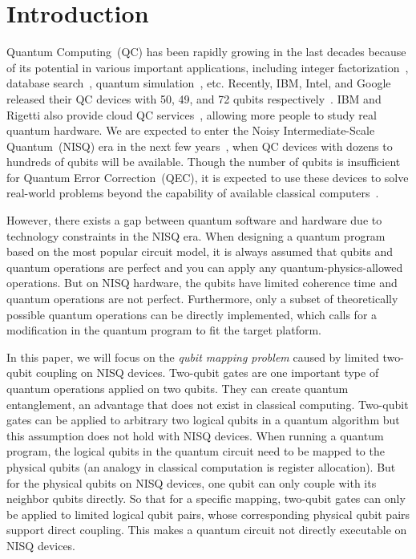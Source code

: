 \documentclass[journal,10pt,twocolumn]{IEEEtran}
\begin{document}
\section{Introduction}
Quantum Computing~(QC) has been rapidly growing in the last decades because of its %
potential in various important applications, including integer factorization~\cite{shor1999polynomial}, database search~\cite{grover1996fast}, quantum simulation~\cite{peruzzo2014variational}, etc. 
Recently, IBM, Intel, and Google released their QC devices with 50, 49, and 72 qubits respectively~\cite{IBM50Q, Intel49Q, Google72Q}. 
IBM and Rigetti also provide cloud QC services~\cite{IBMdevice,RigettiQPU}, allowing more people to study real quantum hardware. 
We are expected to enter the Noisy Intermediate-Scale Quantum~(NISQ) era in the next few years~\cite{preskill2018quantum}, when QC devices with dozens to hundreds of qubits will be available. %
Though the number of qubits is insufficient for Quantum Error Correction~(QEC), it is expected to use these devices to solve real-world problems beyond the capability of available classical computers~\cite{preskill2012quantum,boixo2018characterizing}.

However, there exists a gap between quantum software and hardware due to technology constraints in the NISQ era. 
When designing a quantum program based on the most popular %
circuit model, it is always assumed that qubits and quantum operations are perfect and you can apply any quantum-physics-allowed operations.
But on NISQ hardware, the qubits have limited coherence time and quantum operations are not perfect. 
Furthermore, only a subset of theoretically possible quantum operations can be directly implemented, which calls for a modification in the quantum program to fit the target platform.

In this paper, we will focus on the \textit{qubit mapping problem} caused by limited two-qubit coupling on NISQ devices. 
Two-qubit gates are one important type of quantum operations applied on two qubits. 
They can create quantum entanglement, an advantage that does not exist in classical computing.
Two-qubit gates can be applied to arbitrary two logical qubits in a quantum algorithm but this assumption does not hold with NISQ devices.
When running a quantum program, the logical qubits in the quantum circuit need to be mapped to the physical qubits (an analogy in classical computation is register allocation). 
But for the physical qubits on NISQ devices, one qubit can only couple with its neighbor qubits directly. 
So that for a specific mapping, two-qubit gates can only be applied to limited logical qubit pairs, whose corresponding physical qubit pairs support direct coupling.
This makes a quantum circuit not directly executable on NISQ devices.
\end{document}
